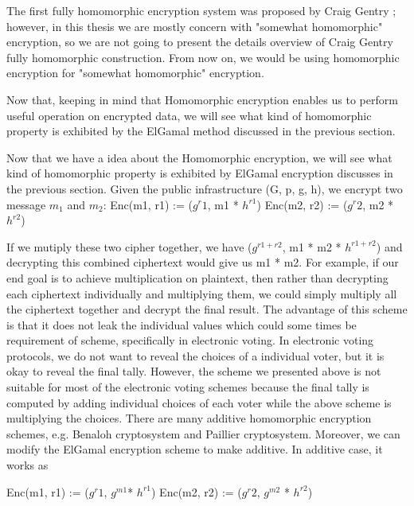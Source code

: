 		\noindent
		The first fully homomorphic encryption system was proposed by Craig Gentry \citep{Gentry:2009:FHE:1834954}; however, 
		in this thesis we are mostly concern with "somewhat homomorphic" encryption, so we are not going to present the details overview 
		of Craig Gentry fully homomorphic construction. From now on, we would be using homomorphic encryption for 
		 "somewhat homomorphic" encryption. 
		 	    
	    
	    
	    
	     
	    Now that, keeping in mind that Homomorphic encryption enables us to perform useful operation on encrypted data, 
	    we will see what kind of homomorphic property is exhibited by the ElGamal method discussed in the previous section. 
	    
	     
	     Now that we have a idea about the Homomorphic encryption, we will see what kind of homomorphic property is 
	     exhibited by ElGamal encryption discusses in the previous section.  Given the public infrastructure (G, p, g, h), 
	     we encrypt two message $m_{1}$ and $m_{2}$:
	     Enc(m1, r1) := ($g^r1$, m1 * $ h^{r1}$) 
	     Enc(m2, r2) := ($g^r2$, m2 * $ h^{r2}$) 
	     
	     If we mutiply these two cipher together, we have  ($g^{r1+ r2}$, m1 * m2 * $ h^{r1 + r2}$) and decrypting this combined ciphertext 
	     would give us m1 * m2. For example, if our end goal is  to achieve multiplication on plaintext, then rather than decrypting each ciphertext individually 
	     and multiplying them, we could simply multiply all the ciphertext together and decrypt the final result. The advantage of this scheme 
	     is that it does not leak the individual values which could some times be requirement of scheme, specifically in electronic voting. 
	     In electronic voting protocols, we do not want to reveal the choices of a individual voter, but it is okay to reveal the final tally.
	     However, the scheme we presented above is not suitable for most of the electronic voting schemes because the final tally 
	     is computed by adding individual choices of each voter while the above scheme is multiplying the choices.  There are 
	     many additive homomorphic encryption schemes, e.g. Benaloh cryptosystem and Paillier cryptosystem. Moreover, we 
	     can modify the ElGamal encryption scheme to make additive. In additive case, it works as 
	     
	      Enc(m1, r1) := ($g^r1$, $g^{m1} $* $ h^{r1}$) 
	      Enc(m2, r2) := ($g^r2$, $g^{m2}$ * $ h^{r2}$) 
	      
